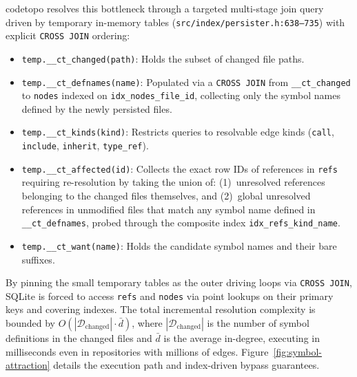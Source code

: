 codetopo resolves this bottleneck through a targeted multi-stage join query driven by temporary
in-memory tables (\texttt{src/index/persister.h:638--735}) with explicit \texttt{CROSS JOIN} ordering:
\begin{itemize}
  \item \texttt{temp.\_\_ct\_changed(path)}: Holds the subset of changed file paths.
  \item \texttt{temp.\_\_ct\_defnames(name)}: Populated via a \texttt{CROSS JOIN} from \texttt{\_\_ct\_changed}
        to \texttt{nodes} indexed on \texttt{idx\_nodes\_file\_id}, collecting only the symbol names defined
        by the newly persisted files.
  \item \texttt{temp.\_\_ct\_kinds(kind)}: Restricts queries to resolvable edge kinds (\texttt{call},
        \texttt{include}, \texttt{inherit}, \texttt{type\_ref}).
  \item \texttt{temp.\_\_ct\_affected(id)}: Collects the exact row IDs of references in \texttt{refs} requiring
        re-resolution by taking the union of: (1)~unresolved references belonging to the changed files themselves,
        and (2)~global unresolved references in unmodified files that match any symbol name defined in
        \texttt{\_\_ct\_defnames}, probed through the composite index \texttt{idx\_refs\_kind\_name}.
  \item \texttt{temp.\_\_ct\_want(name)}: Holds the candidate symbol names and their bare suffixes.
\end{itemize}
By pinning the small temporary tables as the outer driving loops via \texttt{CROSS JOIN}, SQLite is forced
to access \texttt{refs} and \texttt{nodes} via point lookups on their primary keys and covering indexes.
The total incremental resolution complexity is bounded by $O(|\mathcal{D}_{\text{changed}}| \cdot \bar{d})$,
where $|\mathcal{D}_{\text{changed}}|$ is the number of symbol definitions in the changed files and $\bar{d}$
is the average in-degree, executing in milliseconds even in repositories with millions of edges.
Figure~\ref{fig:symbol-attraction} details the execution path and index-driven bypass guarantees.

